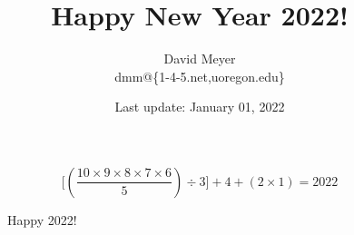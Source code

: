 \documentclass[11pt, oneside]{article}   	%
\title{Happy New Year 2022!}
\author{David Meyer \\ dmm@\{1-4-5.net,uoregon.edu\}}
\date{Last update: January 01, 2022}
\theoremstyle{definition}
\begin{document}
\maketitle
\begin{figure}
\centering
\begin{framed}
{\huge
\begin{equation*}
\Bigg [ \left ( \dfrac{10 \times 9 \times 8 \times 7 \times 6}{5}  \right ) \div 3 \Bigg ] \! + 4 + (2 \times 1) = 2022
\end{equation*}}
\end{framed}
\caption{Happy 2022!}
\end{figure}
\end{document}
